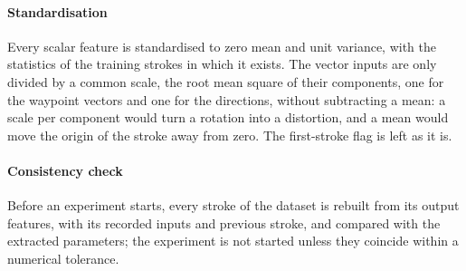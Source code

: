 \documentclass[12pt]{report}
\begin{document}
\paragraph{Standardisation}
Every scalar feature is standardised to zero mean and unit variance, with the statistics of the training strokes in which it exists. The vector inputs are only divided by a common scale, the root mean square of their components, one for the waypoint vectors and one for the directions, without subtracting a mean: a scale per component would turn a rotation into a distortion, and a mean would move the origin of the stroke away from zero. The first-stroke flag is left as it is.

\paragraph{Consistency check}
Before an experiment starts, every stroke of the dataset is rebuilt from its output features, with its recorded inputs and previous stroke, and compared with the extracted parameters; the experiment is not started unless they coincide within a numerical tolerance.
\end{document}
